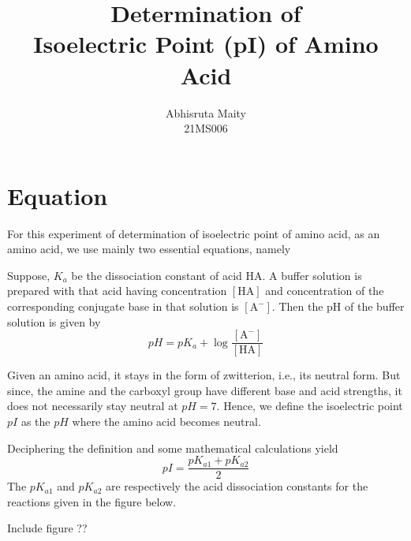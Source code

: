 \documentclass[11pt, a4paper, abstract=true]{scrartcl}
\begin{document}
\subject{
    CH1202: Lab Report
}
\title{
    \huge Determination of \\
    Isoelectric Point (pI) of Amino Acid
}
\author{
    Abhisruta Maity \\
    {\normalsize 21MS006}
}
\date{}
\publishers{
    \normalsize \emph{Indian Institute of Science Education and Research, Kolkata \\
    Mohanpur, West Bengal, 741246, India}
}
\maketitle

\tableofcontents

\newpage

\section{Equation}

For this experiment of determination of isoelectric point of amino acid, as an amino acid, we use mainly two essential equations, namely 
\begin{proposition}
    Suppose, \(K_a\) be the dissociation constant of acid \(\text{HA}\). A buffer solution is prepared with that acid having concentration \([\text{HA}]\) and concentration of the corresponding conjugate base in that solution is \([\text{A}^-]\). Then the pH of the buffer solution is given by 
    \begin{equation*}
        pH = pK_a + \log{\frac{[\text{A}^-]}{[\text{HA}]}}
    \end{equation*}
\end{proposition}

\begin{definition}
    Given an amino acid, it stays in the form of zwitterion, i.e., its neutral form. But since, the amine and the carboxyl group have different base and acid strengths, it does not necessarily stay neutral at \(pH = 7\). Hence, we define the isoelectric point \(pI\) as the \(pH\) where the amino acid becomes neutral. 
\end{definition}

\begin{proposition}
    Deciphering the definition and some mathematical calculations yield 
    \begin{equation*}
        pI = \frac{pK_{a1} + pK_{a2}}{2}
    \end{equation*}
    The \(pK_{a1}\) and \(pK_{a2}\) are respectively the acid dissociation constants for the reactions given in the figure below.

    Include figure ??
\end{proposition}
\end{document}
